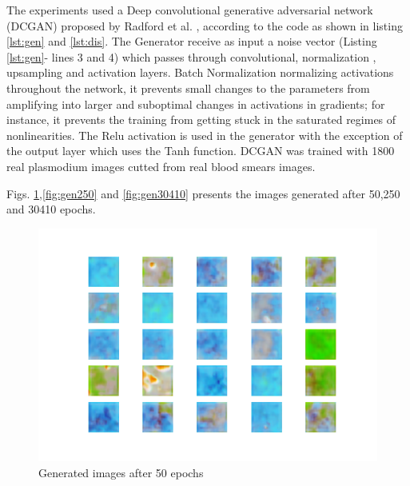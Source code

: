 The experiments used a Deep convolutional generative adversarial network (DCGAN) proposed by Radford et al. \cite{Radford2015}, according to the code as shown in listing \ref{lst:gen} and \ref{lst:dis}. The Generator receive as input a noise vector (Listing \ref{lst:gen}- lines 3 and 4) which passes through convolutional, normalization , upsampling and activation layers. Batch Normalization normalizing activations throughout the network, it prevents small changes to the parameters from amplifying into larger and suboptimal changes in activations in gradients; for instance, it prevents the training from getting stuck in the saturated regimes of nonlinearities. The Relu activation is used in the generator with the exception of the output layer which uses the Tanh function. DCGAN  was trained with 1800 real plasmodium images cutted from real blood smears images.







Figs. \ref{fig:gen50},\ref{fig:gen250} and \ref{fig:gen30410} presents the images generated after 50,250 and 30410 epochs.


\begin{figure}[h]
\caption{Generated images after 50 epochs}
\label{fig:gen50}
\begin{center}
\includegraphics[scale=0.45]{./images/generation/alta_mnist_50.png} \end{center}
\end{figure}

